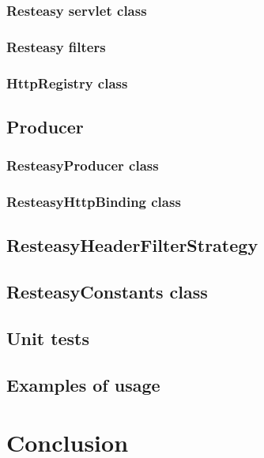 \documentclass[12pt,final,oneside]{fithesis2}
\begin{document}
\subsection{Resteasy servlet class}
\subsection{Resteasy filters}
\subsection{HttpRegistry class}

\section{Producer}
\subsection{ResteasyProducer class}
\subsection{ResteasyHttpBinding class}
\section{ResteasyHeaderFilterStrategy}
\section{ResteasyConstants class}
\section{Unit tests}
\section{Examples of usage}

\chapter{Conclusion}








\begingroup
\def\tmpchapter{0}
\renewcommand{\chaptername}{}
\renewcommand{\thechapter}{}
\end{document}
